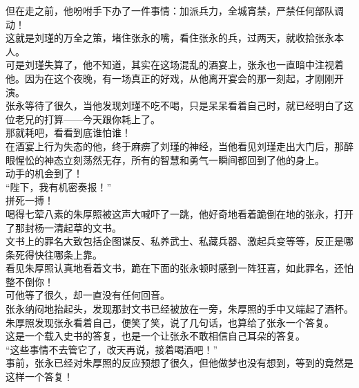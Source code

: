\begin{multicols}{\theparacolNo}
但在走之前，他吩咐手下办了一件事情：加派兵力，全城宵禁，严禁任何部队调动！\\

这就是刘瑾的万全之策，堵住张永的嘴，看住张永的兵，过两天，就收拾张永本人。\\

可是刘瑾失算了，他不知道，其实在这场混乱的酒宴上，张永也一直暗中注视着他。因为在这个夜晚，有一场真正的好戏，从他离开宴会的那一刻起，才刚刚开演。\\

张永等待了很久，当他发现刘瑾不吃不喝，只是呆呆看着自己时，就已经明白了这位老兄的打算——今天跟你耗上了。\\

那就耗吧，看看到底谁怕谁！\\

在酒宴上行为失态的他，终于麻痹了刘瑾的神经，当他看见刘瑾走出大门后，那醉眼惺忪的神态立刻荡然无存，所有的智慧和勇气一瞬间都回到了他的身上。\\

动手的机会到了！\\

“陛下，我有机密奏报！”\\

拼死一搏！\\

喝得七荤八素的朱厚照被这声大喊吓了一跳，他好奇地看着跪倒在地的张永，打开了那封杨一清起草的文书。\\

文书上的罪名大致包括企图谋反、私养武士、私藏兵器、激起兵变等等，反正是哪条死得快往哪条上靠。\\

看见朱厚照认真地看着文书，跪在下面的张永顿时感到一阵狂喜，如此罪名，还怕整不倒你！\\

可他等了很久，却一直没有任何回音。\\

张永纳闷地抬起头，发现那封文书已经被放在一旁，朱厚照的手中又端起了酒杯。\\

朱厚照发现张永看着自己，便笑了笑，说了几句话，也算给了张永一个答复。\\

这是一个载入史书的答复，也是一个让张永不敢相信自己耳朵的答复。\\

“这些事情不去管它了，改天再说，接着喝酒吧！”\\

事前，张永已经对朱厚照的反应预想了很久，但他做梦也没有想到，等到的竟然是这样一个答复！\\


\end{multicols}
